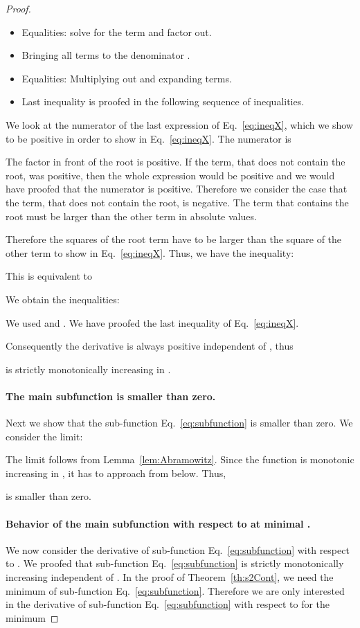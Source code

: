 \documentclass{article}
\begin{document}
\begin{proof}
\begin{itemize}
\item Equalities: solve for the term and factor out.

\item Bringing all terms to the denominator
.

\item Equalities: Multiplying out and expanding terms.

\item Last inequality  is proofed in the following sequence of
  inequalities.
\end{itemize}

We look at the numerator of the last expression of 
Eq.~\eqref{eq:ineqX}, which we show to be
positive in order to show  in 
Eq.~\eqref{eq:ineqX}. The numerator is 

The factor in front of the root is positive.
If the term, that does not contain the root, was positive, then the whole expression would be positive and 
we would have proofed that the numerator is positive. 
Therefore we consider the case that the term, that does not contain the root, is negative.
The term that contains the root must be larger than the other term in absolute values. 

Therefore the squares of the root term have to be larger 
than the square of the other term to show  in 
Eq.~\eqref{eq:ineqX}.
Thus, we have the inequality:


This is equivalent to

We obtain the inequalities: 

We used  and .
We have proofed the last inequality  of Eq.~\eqref{eq:ineqX}.

Consequently the derivative is always positive independent of ,
thus 

is strictly monotonically increasing in .


\paragraph{The main subfunction is smaller than zero.} 
Next we show that the 
sub-function Eq.~\eqref{eq:subfunction} is smaller
than zero.
We consider the limit:

The limit follows from Lemma~\ref{lem:Abramowitz}.
Since the function is monotonic increasing in , it has to approach
 from below. Thus,

is smaller than zero.

\paragraph{Behavior of the main subfunction with respect to  at minimal .} 
We now consider the derivative of sub-function
Eq.~\eqref{eq:subfunction} with respect to .
We proofed that sub-function
Eq.~\eqref{eq:subfunction} is  strictly monotonically increasing 
independent of . 
In the proof of Theorem~\ref{th:s2Cont}, we need the minimum
of  sub-function
Eq.~\eqref{eq:subfunction}. Therefore we are only interested in the
derivative of sub-function
Eq.~\eqref{eq:subfunction} with respect to 
for the minimum  


\end{proof}
\end{document}
